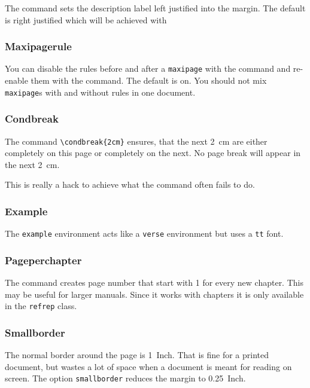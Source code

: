 The  command sets the description label 
left justified into the margin. The default is right justified which 
will be achieved with 

\subsubsection{Maxipagerule}

You can disable the rules before and after a \texttt{maxipage} with the
 command and re-enable them with the
 command.  The default is on.  You should not mix
\texttt{maxipage}s with and without rules in one document.

\subsubsection{Condbreak}

The command \verb|\condbreak{2cm}| ensures, that the next 2~cm are 
either completely on this page or completely on the next. No 
page break will appear in the next 2~cm.

This is really a hack to achieve what the  command often fails
to do.

\subsubsection{Example}

The \texttt{example} environment acts like a \texttt{verse} 
environment but uses a \texttt{tt} font.  

\subsubsection{Pageperchapter}

The command  creates page number that start with 
1 for every new chapter. This may be useful for larger manuals. Since 
it works with chapters it is only available in the 
\texttt{refrep} class.

\subsubsection{Smallborder}

The normal border around the page is 1~Inch. That is fine for a printed
document, but wastes a lot of space when a document is meant for reading on
screen. The option \texttt{smallborder} reduces the margin to 0.25~Inch. 


